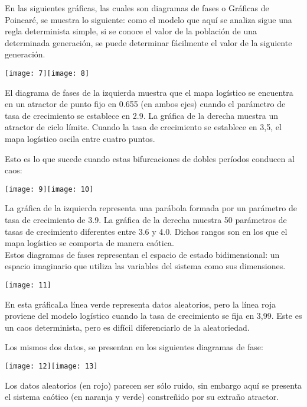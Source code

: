 \documentclass[12pt]{article}
\begin{document}
\begin{doublespace}
\pagebreak
En las siguientes gráficas, las cuales son diagramas de fases o Gráficas de Poincaré, se muestra lo siguiente: como el modelo que aquí se analiza sigue una regla determinista simple, si se conoce el valor de la población de una determinada generación, se puede determinar fácilmente el valor de la siguiente generación.
\begin{center}
\texttt{[image: 7]}\texttt{[image: 8]}
\end{center}

El diagrama de fases de la izquierda muestra que el mapa logístico se encuentra en un atractor de punto fijo en 0.655 (en ambos ejes) cuando el parámetro de tasa de crecimiento se establece en 2.9. La gráfica de la derecha muestra un atractor de ciclo límite. Cuando la tasa de crecimiento se establece en 3,5, el mapa logístico oscila entre cuatro puntos. 

Esto es lo que sucede cuando estas bifurcaciones de dobles períodos conducen al caos:
\begin{center}
\texttt{[image: 9]}\texttt{[image: 10]}
\end{center}

La gráfica de la izquierda representa una parábola formada por un parámetro de tasa de crecimiento de 3.9. La gráfica de la derecha muestra 50 parámetros de tasas de crecimiento diferentes entre 3.6 y 4.0. Dichos rangos son en los que el mapa logístico se comporta de manera caótica. 
\\


Estos diagramas de fases representan el espacio de estado bidimensional: un espacio imaginario que utiliza las variables del sistema como sus dimensiones.

\begin{center}
\texttt{[image: 11]}
\end{center}

En esta gráficaLa línea verde representa datos aleatorios, pero la línea roja proviene del modelo logístico cuando la tasa de crecimiento se fija en 3,99. Este es un caos determinista, pero es difícil diferenciarlo de la aleatoriedad.

Los mismos dos datos, se presentan en los siguientes diagramas de fase:

\begin{center}
\texttt{[image: 12]}\texttt{[image: 13]}
\end{center}
Los datos aleatorios (en rojo) parecen ser sólo ruido, sin embargo aquí se presenta el sistema caótico (en naranja y verde) constreñido por su extraño atractor.


\end{doublespace}
\end{document}
